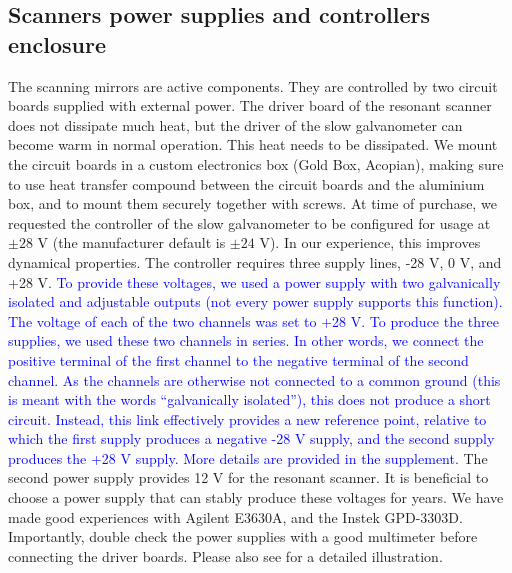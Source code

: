 \documentclass[10pt,letterpaper]{article}
\begin{document}
\subsection*{Scanners power supplies and controllers enclosure}
The scanning mirrors are active components. They are controlled by two circuit boards supplied with external power. The driver board of the resonant scanner does not dissipate much heat, but the driver of the slow galvanometer can become warm in normal operation. This heat needs to be dissipated. We mount the circuit boards in a custom electronics box (Gold Box, Acopian), making sure to use heat transfer compound between the circuit boards and the aluminium box, and to mount them securely together with screws. At time of purchase, we requested the controller of the slow galvanometer to be configured for usage at $\pm 28\text{ V}$ (the manufacturer default is $\pm 24\text{ V}$). In our experience, this  improves dynamical properties. The controller requires three supply lines, -28 V, 0 V, and +28 V. \textcolor{blue}{To provide these voltages, we used a power supply with two galvanically isolated and adjustable outputs (not every power supply supports this function). The voltage of each of the two channels was set to +28 V. To produce the three supplies, we used these two channels in series. In other words, we connect the positive terminal of the first channel to the negative terminal of the second channel. As the channels are otherwise not connected to a common ground (this is meant with the words ``galvanically isolated''), this does not produce a short circuit. Instead, this link effectively provides a new reference point, relative to which the first supply produces a negative -28 V supply, and the second supply produces the +28 V supply. More details are provided in the supplement.} The second power supply provides 12 V for the resonant scanner. It is beneficial to choose a power supply that can stably produce these voltages for years. We have made good experiences with Agilent E3630A, and the Instek GPD-3303D. Importantly, double check the power supplies with a good multimeter before connecting the driver boards. Please also see  for a detailed illustration.
\end{document}
